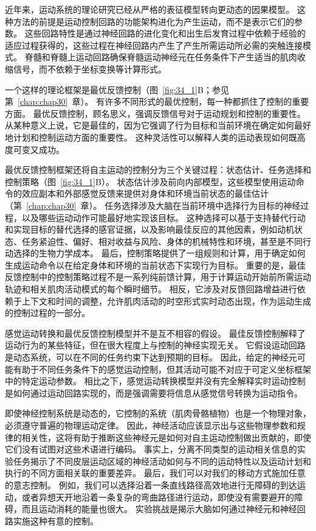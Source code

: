 近年来，运动系统的理论研究已经从严格的表征模型转向更动态的因果模型。
这种方法的前提是运动控制回路的功能架构进化为产生运动，而不是表示它们的参数。
这些回路特性是通过神经回路的进化变化和出生后发育过程中依赖于经验的适应过程获得的，这些过程在神经回路内产生了产生所需运动所必需的突触连接模式。
脊髓和脊髓上运动回路确保脊髓运动神经元在任务条件下产生适当的肌肉收缩信号，而不依赖于坐标变换等计算形式。


一个这样的理论框架是最优反馈控制（图~\ref{fig:34_1}B；参见第~\ref{chap:chap30}~章）。
有许多不同形式的最优控制，每一种都抓住了控制的重要方面。
最优反馈控制，顾名思义，强调反馈信号对于运动规划和控制的重要性。
从某种意义上说，它是最佳的，因为它强调了行为目标和当前环境在确定如何最好地计划和控制运动方面的重要性。
这种灵活性可以解释人类的运动表现如何既高度可变又成功。


最优反馈控制框架还将自主运动的控制分为三个关键过程：状态估计、任务选择和控制策略（图~\ref{fig:34_1}B）。
状态估计涉及前向内部模型，这些模型使用运动命令的效应副本和外部感觉反馈来提供对身体和环境当前状态的最佳估计（第~\ref{chap:chap30}~章）。
任务选择涉及大脑在当前环境中选择行为目标的神经过程，以及哪些运动动作可能最好地实现该目标。
这种选择可以基于支持替代行动和实现目标的替代选择的感官证据，以及影响最佳反应的其他因素，例如动机状态、任务紧迫性、偏好、相对收益与风险、身体的机械特性和环境，甚至是不同行动选择的生物力学成本。
最后，控制策略提供了一组规则和计算，用于确定如何生成运动命令以在给定身体和环境的当前状态下实现行为目标。
重要的是，最佳反馈控制中的控制策略过程不是一系列纯前馈计算，用于计算运动开始前所需运动轨迹和相关肌肉活动模式的每个瞬时细节。
相反，它涉及对反馈回路增益进行依赖于上下文和时间的调整，允许肌肉活动的时空形式实时动态出现，作为运动生成的控制过程的一部分。


感觉运动转换和最优反馈控制模型并不是互不相容的假设。
最佳反馈控制解释了运动行为的某些特征，但在很大程度上与控制的神经实现无关。
它假设运动回路是动态系统，可以在不同的任务约束下达到预期的目标。
因此，给定的神经元可能有助于不同任务条件下的感觉运动控制，但其活动可能不对应于可定义坐标框架中的特定运动参数。
相比之下，感觉运动转换模型并没有完全解释实时运动控制是如何通过运动回路实现的，而是强调需要将信息从感觉信号转换为运动指令。


即使神经控制系统是动态的，它控制的系统（肌肉骨骼植物）也是一个物理对象，必须遵守普遍的物理运动定律。
因此，神经活动应该显示出与这些物理参数和规律的相关性，这将有助于推断这些神经元是如何对自主运动控制做出贡献的，即使它们没有试图对这些术语进行编码。
事实上，分离不同类型的运动相关信息的实验任务揭示了不同皮层运动区域的神经活动如何与不同的运动特性以及运动计划和执行的不同方面相关联的重要差异。
最后，我们可以对我们的移动方式施加任意的意志控制。
例如，我们可以选择沿着一条直线路径高效地进行无障碍的到达运动，或者异想天开地沿着一条复杂的弯曲路径进行运动，即使没有需要避开的障碍，而且运动消耗的能量也很大。
实验挑战是揭示大脑如何通过神经元和神经回路实施这种有意的控制。



